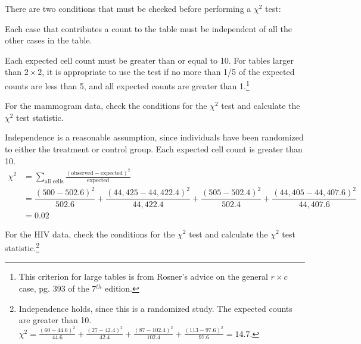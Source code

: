 \begin{termBox}{
There are two conditions that must be checked before performing a $\chi^2$ test:\vspace{-1mm}
\begin{description}
\setlength{\itemsep}{0mm}
	\item[Independence.] Each case that contributes a count to the table must be independent of all the other cases in the table.
	\item[Sample size.] Each expected cell count must be greater than or equal to 10. For tables larger than $2 \times 2$, it is appropriate to use the test if no more than 1/5 of the expected counts are less than 5, and all expected counts are greater than 1.\footnote{This criterion for large tables is from Rosner's advice on the general $r \times c$ case, pg. 393 of the 7$^{th}$ edition.}
\vspace{-1mm}
\end{description}
}
\end{termBox}


\begin{example}{For the mammogram data, check the conditions for the $\chi^2$ test and calculate the $\chi^2$ test statistic.}

Independence is a reasonable assumption, since individuals have been randomized to either the treatment or control group. Each expected cell count is greater than 10.
\begin{align*}
\chi^2 &= \sum_{\text{all cells}} \frac{(\text{observed} - \text{expected})^2}{\text{expected}} \\
&= \dfrac{(500 - 502.6)^2}{502.6} + \dfrac{(44,425 - 44,422.4)^2}{44,422.4} + \dfrac{(505 - 502.4)^2}{502.4} + \dfrac{(44,405 - 44,407.6)^2}{44,407.6} \\
&=0.02
\end{align*}	
	
\end{example}

\begin{exercise} For the HIV data, check the conditions for the $\chi^2$ test and calculate the $\chi^2$ test statistic.\footnote{Independence holds, since this is a randomized study. The expected counts are greater than 10. $\chi^2 = \frac{(60-44.6)^2}{44.6} + \frac{(27-42.4)^2}{42.4} + \frac{(87-102.4)^2}{102.4} + \frac{(113-97.6)^2}{97.6} = 14.7.$}
	
\end{exercise}

